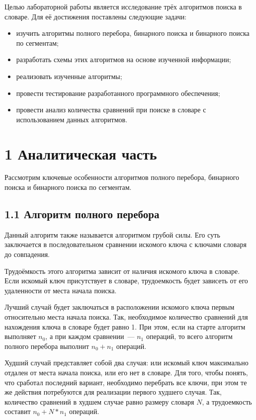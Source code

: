\documentclass[12pt, a4paper]{report}
\begin{document}
	Целью лабораторной работы является исследование трёх алгоритмов поиска в словаре. Для её достижения поставлены следующие задачи:
	\begin{itemize}
		\item изучить алгоритмы полного перебора, бинарного поиска и бинарного поиска по сегментам;
		\item разработать схемы этих алгоритмов на основе изученной информации;
		\item реализовать изученные алгоритмы;
		\item провести тестирование разработанного программного обеспечения;
		\item провести анализ количества сравнений при поиске в словаре с использованием данных алгоритмов.
	\end{itemize}
	
	\newpage
	\chapter*{1 Аналитическая часть}
	
	Рассмотрим ключевые особенности алгоритмов полного перебора, бинарного поиска и бинарного поиска по сегментам.
	
	\section*{1.1 Алгоритм полного перебора}
	
	Данный алгоритм также называется алгоритмом грубой силы. Его суть заключается в последовательном сравнении искомого ключа с ключами словаря до совпадения.
	
	Трудоёмкость этого алгоритма зависит от наличия искомого ключа в словаре. Если искомый ключ присутствует в словаре, трудоемкость будет зависеть от его удаленности от места начала поиска.
	
	Лучший случай будет заключаться в расположении искомого ключа первым относительно места начала поиска. Так, необходимое количество сравнений для нахождения ключа в словаре будет равно 1. При этом, если на старте алгоритм выполняет $n_0$, а при каждом сравнении~--- $n_1$ операций, то всего алгоритм полного перебора выполнит $n_0 + n_1$ операций.
	
	Худший случай представляет собой два случая: или искомый ключ максимально отдален от места начала поиска, или его нет в словаре. Для того, чтобы понять, что сработал последний вариант, необходимо перебрать все ключи, при этом те же действия потребуются для реализации первого худшего случая. Так, количество сравнений в худшем случае равно размеру словаря $N$, а трудоемкость составит $n_0 + N * n_1$ операций.
	
\end{document}
